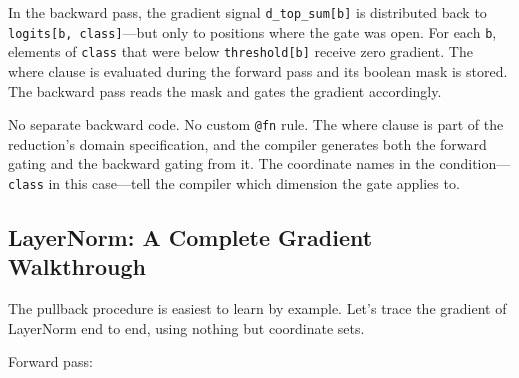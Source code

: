 \documentclass[11pt,titlepage]{article}
\begin{document}
In the backward pass, the gradient signal \texttt{d\_top\_sum{[}b{]}} is
distributed back to \texttt{logits{[}b,\ class{]}}---but only to
positions where the gate was open. For each \texttt{b}, elements of
\texttt{class} that were below \texttt{threshold{[}b{]}} receive zero
gradient. The where clause is evaluated during the forward pass and its
boolean mask is stored. The backward pass reads the mask and gates the
gradient accordingly.

No separate backward code. No custom \texttt{@fn} rule. The where clause
is part of the reduction's domain specification, and the compiler
generates both the forward gating and the backward gating from it. The
coordinate names in the condition---\texttt{class} in this case---tell
the compiler which dimension the gate applies to.

\vspace{2em}

\hypertarget{layernorm-a-complete-gradient-walkthrough}{%
\subsection{LayerNorm: A Complete Gradient
Walkthrough}\label{layernorm-a-complete-gradient-walkthrough}}

The pullback procedure is easiest to learn by example. Let's trace the
gradient of LayerNorm end to end, using nothing but coordinate sets.

Forward pass:
\end{document}
